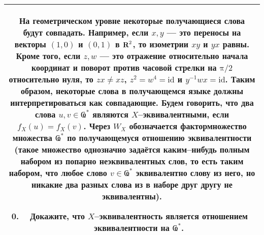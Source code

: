 \begin{center}
\begin{tabular}{|c|}
\hline
	\begin{minipage}{0.85\textwidth}
\medskip
На геометрическом уровне некоторые получающиеся слова будут совпадать. Например, если $x,y$ --- это переносы на векторы $(1,0)$ и $(0,1)$ в $\text{\bfseries R}^2$, то изометрии $xy$ и $yx$ равны. Кроме того, если $z,w$ --- это отражение относительно начала координат и поворот против часовой стрелки на $\text{π}/2$ относительно нуля, то $zx \neq xz$, $z^2 = w^4 = \textrm{id}$ и $y^{-1}wx = \textrm{id}$. Таким образом, некоторые слова в получающемся языке должны интерпретироваться как совпадающие. Будем говорить, что два слова $u,v \in \text{Ҩ}^*$ являются $X$--эквивалентными, если $f_X(u)=f_X(v)$. Через $W_X$ обозначается фактормножество множества $\text{Ҩ}^*$ по получающемуся отношению эквивалентности (такое множество однозначно задаётся каким--нибудь полным набором из попарно неэквивалентных слов, то есть таким набором, что любое слово $v \in \text{Ҩ}^*$ эквивалентно слову из него, но никакие два разных слова из в наборе друг другу не эквивалентны).
\begin{enumerate} \setcounter{enumi}{-1}
\item Докажите, что $X$--эквивалентность является отношением эквивалентности на $\text{Ҩ}^*$.
\end{enumerate} \smallskip
	\end{minipage} \\
\hline
\end{tabular}
\end{center}

\ \\

